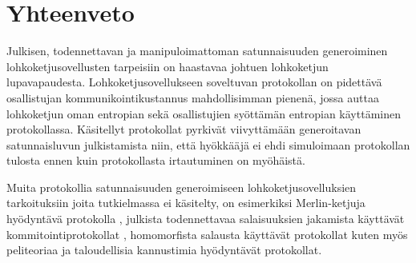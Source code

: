 \chapter{Yhteenveto\label{conclusions}}

Julkisen, todennettavan ja manipuloimattoman satunnaisuuden generoiminen lohkoketjusovellusten tarpeisiin on haastavaa johtuen lohkoketjun lupavapaudesta. Lohkoketjusovellukseen soveltuvan protokollan on pidettävä osallistujan kommunikointikustannus mahdollisimman pienenä, jossa auttaa lohkoketjun oman entropian sekä osallistujien syöttämän entropian käyttäminen protokollassa. Käsitellyt protokollat pyrkivät viivyttämään generoitavan satunnaisluvun julkistamista niin, että hyökkääjä ei ehdi simuloimaan protokollan tulosta ennen kuin protokollasta irtautuminen on myöhäistä.

Muita protokollia satunnaisuuden generoimiseen lohkoketjusovelluksien tarkoituksiin joita tutkielmassa ei käsitelty, on esimerkiksi Merlin-ketjuja hyödyntävä protokolla \cite{MerlinChains}, julkista todennettavaa salaisuuksien jakamista käyttävät kommitointiprotokollat \cite{syta_scalable_2017}, homomorfista salausta käyttävät protokollat kuten myös peliteoriaa ja taloudellisia kannustimia hyödyntävät protokollat.